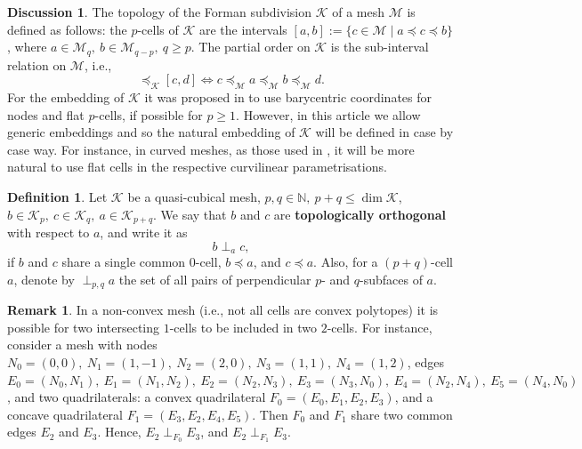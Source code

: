 \documentclass{elsarticle}
\theoremstyle{definition}
\newtheorem{definition}[theorem]{Definition}
\newtheorem{discussion}[theorem]{Discussion}
\newtheorem{remark}[theorem]{Remark}
\newcommand{\N}{\mathbb{N}}
\newcommand{\set}[2]{\{#1 \mid #2\}}
\newcommand{\newterm}[1]{\textbf{#1}}
\begin{document}
\begin{discussion}
  The topology of the Forman subdivision $\mathcal{K}$ of a mesh $\mathcal{M}$ is defined as follows: the $p$-cells of $\mathcal{K}$ are the intervals
  $[a, b] := \set{c \in \mathcal{M}}{a \preceq c \preceq b}$,
  where $a \in \mathcal{M}_q,\ b \in \mathcal{M}_{q - p},\ q \geq p$.
  The partial order on $\mathcal{K}$ is the sub-interval relation on $\mathcal{M}$, i.e.,
  \begin{equation}
    [a, b] \preceq_{\mathcal{K}} [c, d] \Leftrightarrow c \preceq_{\mathcal{M}} a \preceq_{\mathcal{M}} b \preceq_{\mathcal{M}} d.
  \end{equation}
  For the embedding of $\mathcal{K}$ it was proposed in \cite{berbatov2022diffusion} to use barycentric coordinates for nodes and flat $p$-cells, if possible for $p \geq 1$.
  However, in this article we allow generic embeddings and so the natural embedding of $\mathcal{K}$ will be defined in case by case way.
  For instance, in curved meshes, as those used in , it will be more natural to use flat cells in the respective curvilinear parametrisations.
\end{discussion}
\begin{definition}
  Let $\mathcal{K}$ be a quasi-cubical mesh,
  $p, q \in \N,\ p + q \leq \dim \mathcal{K}$,
  $b \in \mathcal{K}_p,\ c \in \mathcal{K}_q,\ a \in \mathcal{K}_{p + q}$.
  We say that $b$ and $c$ are
  \newterm{topologically orthogonal} with respect to $a$, and write it as
  \begin{equation}
    b \perp_a c,
  \end{equation}
  if $b$ and $c$ share a single common $0$-cell, $b \preceq a$, and $c \preceq a$.
  Also, for a $(p + q)$-cell $a$, denote by $\perp_{p, q} a$ the set of all pairs of perpendicular $p$- and $q$-subfaces of $a$.
\end{definition}
\noindent
\begin{minipage}{0.7\textwidth}
\begin{remark}
  In a non-convex mesh (i.e., not all cells are convex polytopes) it is possible for two intersecting $1$-cells to be included in two $2$-cells.
  For instance, consider a mesh with nodes $N_0 = (0, 0),\ N_1 = (1, -1),\ N_2 = (2, 0),\ N_3 = (1, 1),\ N_4 = (1, 2)$, edges $E_0 = (N_0, N_1),\ E_1 = (N_1, N_2),\ E_2 = (N_2, N_3),\ E_3 = (N_3, N_0),\ E_4 = (N_2, N_4),\ E_5 = (N_4, N_0)$, and two quadrilaterals: a convex quadrilateral $F_0 = (E_0, E_1, E_2, E_3)$, and a concave quadrilateral $F_1 = (E_3, E_2, E_4, E_5)$.
  Then $F_0$ and $F_1$ share two common edges $E_2$ and $E_3$.
  Hence, $E_2 \perp_{F_0} E_3$, and $E_2 \perp_{F_1} E_3$.
\end{remark}
\end{minipage}
\end{document}
